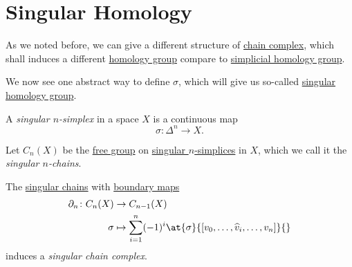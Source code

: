 \section{Singular Homology}
As we noted before, we can give a different structure of \hyperref[def:chain-complex]{chain complex}, which shall
induces a different \hyperref[def:homology-group]{homology group} compare to \hyperref[def:simplicial-homology-group]{simplicial homology group}.

We now see one abstract way to define \(\sigma \), which will give us so-called \hyperref[def:singular-homology-group]{singular homology group}.

\begin{definition}\label{def:singular-simplex}
	A \emph{singular \(n\)-simplex} in a space \(X\) is a continuous map
	\[
		\sigma \colon \Delta^n \to X.
	\]
\end{definition}

\begin{definition}\label{def:singular-chain}
	Let \(C_n(X)\) be the \hyperref[def:free-group]{free group} on \hyperref[def:singular-simplex]{singular \(n\)-simplices} in \(X\), which we
	call it the \emph{singular \(n\)-chains}.
\end{definition}

\begin{definition}\label{def:singular-chain-complex}
	The \hyperref[def:singular-simplex]{singular chains} with \hyperref[def:boundary-homomorphism]{boundary maps}
	\[
		\begin{split}
			\partial_n \colon C_n(X) & \to C_{n - 1}(X)                                                                       \\
			\sigma              & \mapsto \sum_{i = 1}^n (-1)^i \at{\sigma}{[v_0, \ldots, \widehat{v}_i, \ldots, v_n]}{}
		\end{split}
	\]
	induces a \emph{singular chain complex}.
\end{definition}

